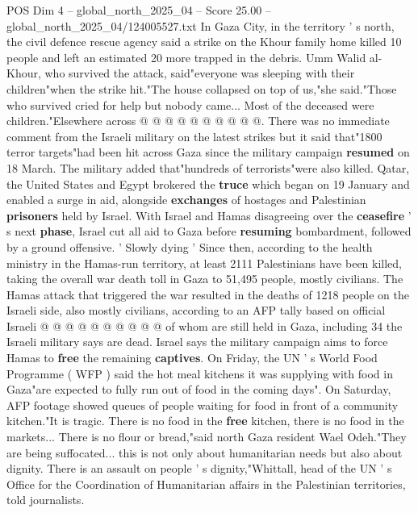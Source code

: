 \begin{textsample}{POS Dim 4 – global\_north\_2025\_04 – Score 25.00 – global\_north\_2025\_04/124005527.txt}
In Gaza City, in the territory ' s north, the civil defence rescue agency said a strike on the Khour family home killed 10 people and left an estimated 20 more trapped in the debris.
Umm Walid al-Khour, who survived the attack, said"everyone was sleeping with their children"when the strike hit."The house collapsed on top of us,"she said."Those who survived cried for help but nobody came...
Most of the deceased were children."Elsewhere across @ @ @ @ @ @ @ @ @ @.
There was no immediate comment from the Israeli military on the latest strikes but it said that"1800 terror targets"had been hit across Gaza since the military campaign \textbf{resumed} on 18 March.
The military added that"hundreds of terrorists"were also killed.
Qatar, the United States and Egypt brokered the \textbf{truce} which began on 19 January and enabled a surge in aid, alongside \textbf{exchanges} of hostages and Palestinian \textbf{prisoners} held by Israel.
With Israel and Hamas disagreeing over the \textbf{ceasefire} ' s next \textbf{phase}, Israel cut all aid to Gaza before \textbf{resuming} bombardment, followed by a ground offensive. ' Slowly dying ' Since then, according to the health ministry in the Hamas-run territory, at least 2111 Palestinians have been killed, taking the overall war death toll in Gaza to 51,495 people, mostly civilians.
The Hamas attack that triggered the war resulted in the deaths of 1218 people on the Israeli side, also mostly civilians, according to an AFP tally based on official Israeli @ @ @ @ @ @ @ @ @ @ of whom are still held in Gaza, including 34 the Israeli military says are dead.
Israel says the military campaign aims to force Hamas to \textbf{free} the remaining \textbf{captives}.
On Friday, the UN ' s World Food Programme ( WFP ) said the hot meal kitchens it was supplying with food in Gaza"are expected to fully run out of food in the coming days".
On Saturday, AFP footage showed queues of people waiting for food in front of a community kitchen."It is tragic.
There is no food in the \textbf{free} kitchen, there is no food in the markets...
There is no flour or bread,"said north Gaza resident Wael Odeh."They are being suffocated... this is not only about humanitarian needs but also about dignity.
There is an assault on people ' s dignity,"Whittall, head of the UN ' s Office for the Coordination of Humanitarian affairs in the Palestinian territories, told journalists.

\end{textsample}
